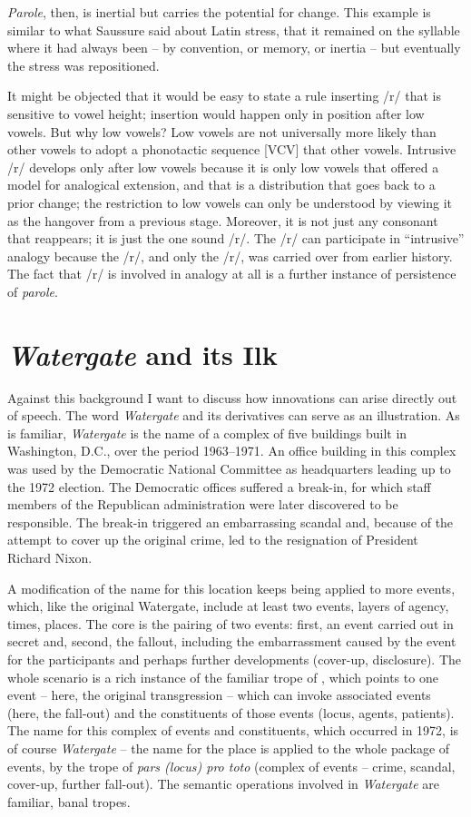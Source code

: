 \documentclass[output=paper,
modfonts
]{LSP/langsci}
\begin{document}
\emph{Parole}, then, is inertial but carries the potential for change.
This example is similar to what Saussure said about Latin stress, that
it remained on the syllable where it had always been -- by convention, or
memory, or inertia -- but eventually the stress was repositioned.

It might be objected that it would be easy to state a rule inserting /r/
that is sensitive to vowel height; insertion would happen only in
position after low vowels. But why low vowels? Low vowels are not
universally more likely than other vowels to adopt a phonotactic
sequence {[}VCV{]} that other vowels. Intrusive /r/ develops only after
low vowels because it is only low vowels that offered a model for
analogical extension, and that is a distribution that goes back to a
prior change; the restriction to low vowels can only be understood by
viewing it as the hangover from a previous stage. Moreover, it is not
just any consonant that reappears; it is just the one sound /r/. The /r/
can participate in ``intrusive'' analogy because the /r/, and only the
/r/, was carried over from earlier history. The fact that /r/ is
involved in analogy at all is a further instance of persistence of
\emph{parole}.

\section{\emph{Watergate} and its Ilk}

Against this background I want to discuss how innovations can arise
directly out of speech. The word \emph{Watergate} and its derivatives
can serve as an illustration. As is familiar, \emph{Watergate} is the
name of a complex of five buildings built in Washington, D.C., over the
period 1963--1971. An office building in this complex was used by the
Democratic National Committee as headquarters leading up to the 1972
election. The Democratic offices suffered a break-in, for which staff
members of the Republican administration were later discovered to be
responsible. The break-in triggered an embarrassing scandal and, because
of the attempt to cover up the original crime, led to the resignation of
President Richard Nixon.

A modification of the name for this location keeps being applied to more
events, which, like the original Watergate, include at least two events,
layers of agency, times, places. The core is the pairing of two events:
first, an event carried out in secret and, second, the fallout,
including the embarrassment caused by the event for the participants and
perhaps further developments (cover-up, disclosure). The whole scenario
is a rich instance of the familiar trope of , which points to
one event -- here, the original transgression -- which can invoke
associated events (here, the fall-out) and the constituents of those
events (locus, agents, patients). The name for this complex of events
and constituents, which occurred in 1972, is of course
\emph{Watergate} -- the name for the place is applied to the whole
package of events, by the trope of \emph{pars (locus) pro toto} (complex of
events -- crime, scandal, cover-up, further fall-out). The semantic
operations involved in \emph{Watergate} are familiar, banal tropes.
\end{document}
